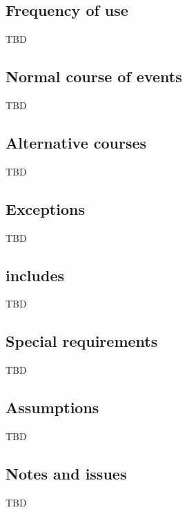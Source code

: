 \documentclass[a4paper]{article}
\begin{document}
\subsection{Frequency of use}
TBD
\subsection{Normal course of events}
TBD
\subsection{Alternative courses}
TBD
\subsection{Exceptions}
TBD
\subsection{includes}
TBD
\subsection{Special requirements}
TBD
\subsection{Assumptions}
TBD
\subsection{Notes and issues}
TBD
\end{document}
